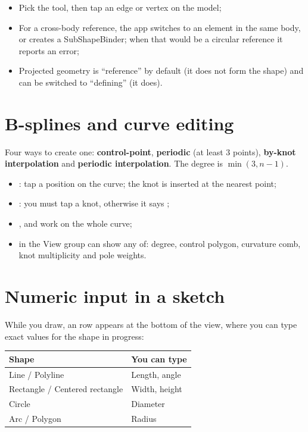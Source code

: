 \begin{itemize}
  \item Pick the tool, then tap an edge or vertex on the model;
  \item For a cross-body reference, the app switches to an element in the same body, or creates a SubShapeBinder; when
        that would be a circular reference it reports an error;
  \item Projected geometry is ``reference'' by default (it does not form the shape) and can be switched to ``defining''
        (it does).
\end{itemize}

\section{B-splines and curve editing}

Four ways to create one: \textbf{control-point}, \textbf{periodic} (at least 3 points), \textbf{by-knot interpolation} and
\textbf{periodic interpolation}. The degree is $\min(3, n-1)$.

\begin{itemize}
  \item {}: tap a position on the curve; the knot is inserted at the nearest point;
  \item {}: you must tap a knot, otherwise it says ;
  \item {},  and  work on the whole curve;
  \item {} in the View group can show any of: degree, control polygon, curvature comb, knot multiplicity and
        pole weights.
\end{itemize}

\section{Numeric input in a sketch}

While you draw, an  row appears at the bottom of the view, where you can type exact values for the shape in
progress:

\begin{center}
\small
\begin{tabularx}{\linewidth}{@{}lX@{}}
\toprule
\textbf{Shape} & \textbf{You can type} \\
\midrule
Line / Polyline & Length, angle \\
Rectangle / Centered rectangle & Width, height \\
Circle & Diameter \\
Arc / Polygon & Radius \\
\bottomrule
\end{tabularx}
\end{center}

